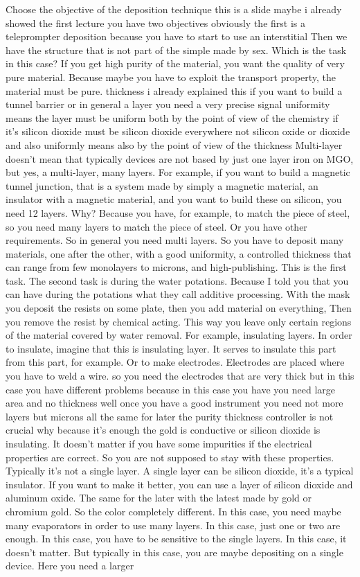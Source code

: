 Choose the objective of the deposition technique this is a slide maybe i already showed the first lecture you have two objectives obviously the first is a teleprompter deposition because you have to start to use an interstitial Then we have the structure that is not part of the simple made by sex. Which is the task in this case? If you get high purity of the material, you want the quality of very pure material. Because maybe you have to exploit the transport property, the material must be pure. thickness i already explained this if you want to build a tunnel barrier or in general a layer you need a very precise signal uniformity means the layer must be uniform both by the point of view of the chemistry if it's silicon dioxide must be silicon dioxide everywhere not silicon oxide or dioxide and also uniformly means also by the point of view of the thickness Multi-layer doesn't mean that typically devices are not based by just one layer iron on MGO, but yes, a multi-layer, many layers. For example, if you want to build a magnetic tunnel junction, that is a system made by simply a magnetic material, an insulator with a magnetic material, and you want to build these on silicon, you need 12 layers. Why? Because you have, for example, to match the piece of steel, so you need many layers to match the piece of steel. Or you have other requirements. So in general you need multi layers. So you have to deposit many materials, one after the other, with a good uniformity, a controlled thickness that can range from few monolayers to microns, and high-publishing. This is the first task. The second task is during the water potations. Because I told you that you can have during the potations what they call additive processing. With the mask you deposit the resists on some plate, then you add material on everything, Then you remove the resist by chemical acting. This way you leave only certain regions of the material covered by water removal. For example, insulating layers. In order to insulate, imagine that this is insulating layer. It serves to insulate this part from this part, for example. Or to make electrodes. Electrodes are placed where you have to weld a wire. so you need the electrodes that are very thick but in this case you have different problems because in this case you have you need large area and no thickness well once you have a good instrument you need not more layers but microns all the same for later the purity thickness controller is not crucial why because it's enough the gold is conductive or silicon dioxide is insulating. It doesn't matter if you have some impurities if the electrical properties are correct. So you are not supposed to stay with these properties. Typically it's not a single layer. A single layer can be silicon dioxide, it's a typical insulator. If you want to make it better, you can use a layer of silicon dioxide and aluminum oxide. The same for the later with the latest made by gold or chromium gold. So the color completely different. In this case, you need maybe many evaporators in order to use many layers. In this case, just one or two are enough. In this case, you have to be sensitive to the single layers. In this case, it doesn't matter. But typically in this case, you are maybe depositing on a single device. Here you need a larger 